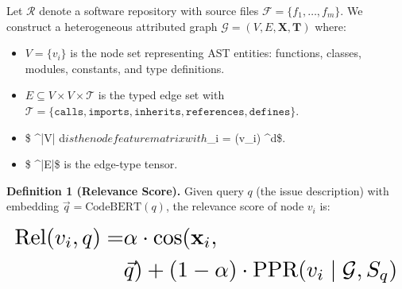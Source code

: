 \documentclass[10pt,twocolumn,letterpaper]{article}
\begin{document}
Let $\mathcal{R}$ denote a software repository with source files $\mathcal{F} = \{f_1, \ldots, f_m\}$. We construct a heterogeneous attributed graph $\mathcal{G} = (V, E, \mathbf{X}, \mathbf{T})$ where:

\begin{itemize}
  \item $V = \{v_i\}$ is the node set representing AST entities: functions, classes, modules, constants, and type definitions.
  \item $E \subseteq V \times V \times \mathcal{T}$ is the typed edge set with $\mathcal{T} = \{\texttt{calls}, \texttt{imports}, \texttt{inherits}, \texttt{references}, \texttt{defines}\}$.
  \item \$ \in {}^{|V| \times d}$ is the node feature matrix with $\_i = (v\_i) \in {}^d\$.
  \item \$ \in {}^{|E|}\$ is the edge-type tensor.
\end{itemize}

\textbf{Definition 1 (Relevance Score).} Given query $q$ (the issue description) with embedding $\vec{q} = \text{CodeBERT}(q)$, the relevance score of node $v_i$ is:




























\begin{equation}
\resizebox{\columnwidth}{!}{$\displaystyle
\begin{aligned}
\text{Rel}(v_i, q) = & \alpha \cdot \cos(\mathbf{x}_i, \\
& \vec{q}) + (1 - \alpha) \cdot \text{PPR}(v_i \mid \mathcal{G}, S_q)
\end{aligned}
$}
\end{equation}
\end{document}
